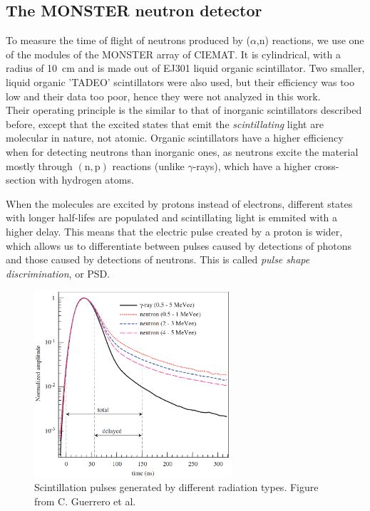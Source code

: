 \documentclass[a4paper,12pt]{report}
\newcommand{\an}{($\alpha$,n) }
\begin{document}
\subsection{The MONSTER neutron detector}
To measure the time of flight of neutrons produced by \an reactions, we use one of the modules of the MONSTER array of CIEMAT.\cite{MONSTER}
It is cylindrical, with a radius of \qty{10}{\cm} and is made out of EJ301 liquid organic scintillator.\cite{ej301}
Two smaller, liquid organic 'TADEO' scintillators were also used, but their efficiency was too low and their data too poor, hence they were not analyzed in this work.
\\

Their operating principle is the similar to that of inorganic scintillators described before, except that the excited states that emit the \textit{scintillating} light are molecular in nature, not atomic.
Organic scintillators have a higher efficiency when for detecting neutrons than inorganic ones, as neutrons excite the material mostly through $\left( \text{n},\text{p}  \right)$ reactions (unlike $\gamma$-rays), which have a higher cross-section with hydrogen atoms.

When the molecules are excited by protons instead of electrons, different states with longer half-lifes are populated and scintillating light is emmited with a higher delay.
This means that the electric pulse created by a proton is wider, which allows us to differentiate between pulses caused by detections of photons and those caused by detections of neutrons.
This is called \textit{pulse shape discrimination}, or PSD.

\begin{figure}[H]
	\centering
	\includegraphics[width=0.65\textwidth]{psd_explanation.png}
	\caption{Scintillation pulses generated by different radiation types.
	Figure from C. Guerrero et al.\cite{guerrero2008}}
	\label{psd_explanation}
\end{figure}
\end{document}
